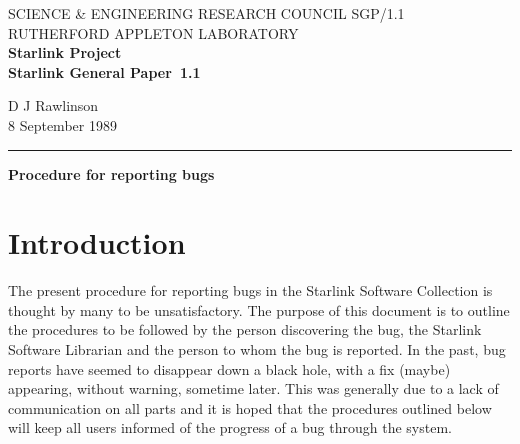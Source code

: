 \pagestyle{myheadings}

\newcommand{\stardoccategory}  {Starlink General Paper}
\newcommand{\stardocinitials}  {SGP}
\newcommand{\stardocnumber}    {1.1}
\newcommand{\stardocauthors}   {D J Rawlinson}
\newcommand{\stardocdate}      {8 September 1989}
\newcommand{\stardoctitle}     {Procedure for reporting bugs}

\newcommand{\stardocname}{\stardocinitials /\stardocnumber}
\markright{\stardocname}
\setlength{\textwidth}{160mm}
\setlength{\textheight}{240mm}
\setlength{\topmargin}{-5mm}
\setlength{\oddsidemargin}{0mm}
\setlength{\evensidemargin}{0mm}
\setlength{\parindent}{0mm}
\setlength{\parskip}{\medskipamount}
\setlength{\unitlength}{1mm}



\thispagestyle{empty}
SCIENCE \& ENGINEERING RESEARCH COUNCIL \hfill \stardocname\\
RUTHERFORD APPLETON LABORATORY\\
{\large\bf Starlink Project\\}
{\large\bf \stardoccategory\ \stardocnumber}
\begin{flushright}
\stardocauthors\\
\stardocdate
\end{flushright}
\vspace{-4mm}
\rule{\textwidth}{0.5mm}
\vspace{5mm}
\begin{center}
{\Large\bf \stardoctitle}
\end{center}
\vspace{5mm}


\section{Introduction}
The present procedure for reporting bugs in the Starlink Software Collection is
thought by many to be unsatisfactory. The purpose of this document is to outline
the procedures to be followed by the person discovering the bug, the Starlink 
Software Librarian and the person to whom the bug is reported. In the past,
bug reports have seemed to disappear down a black hole, with a fix (maybe)
appearing, without warning, sometime later. This was generally due to a lack of 
communication on all parts and it is hoped that the procedures outlined below
will keep all users informed of the progress of a bug through the system.

